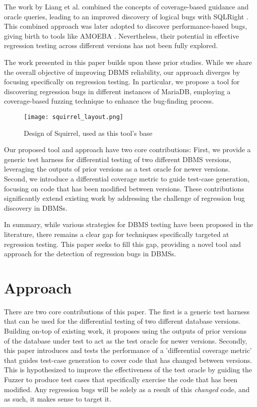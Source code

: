 \documentclass[sigconf]{acmart}
\begin{document}
The work by Liang et al. combined the concepts of coverage-based guidance and oracle queries, leading to an improved discovery of logical bugs with SQLRight \cite{liang2022detecting}. This combined approach was later adopted to discover performance-based bugs, giving birth to tools like AMOEBA \cite{9793961}. Nevertheless, their potential in effective regression testing across different versions has not been fully explored.

The work presented in this paper builds upon these prior studies. While we share the overall objective of improving DBMS reliability, our approach diverges by focusing specifically on regression testing. In particular, we propose a tool for discovering regression bugs in different instances of MariaDB, employing a coverage-based fuzzing technique to enhance the bug-finding process.

\begin{figure}[H]
\centering
\texttt{[image: squirrel\_layout.png]}
\caption{Design of Squirrel, used as this tool's base \cite{zhong2020squirrel}}
\label{fig:Squirrel_execution_flow}
\end{figure}

Our proposed tool and approach have two core contributions: First, we provide a generic test harness for differential testing of two different DBMS versions, leveraging the outputs of prior versions as a test oracle for newer versions. Second, we introduce a differential coverage metric to guide test-case generation, focusing on code that has been modified between versions. These contributions significantly extend existing work by addressing the challenge of regression bug discovery in DBMSs.

In summary, while various strategies for DBMS testing have been proposed in the literature, there remains a clear gap for techniques specifically targeted at regression testing. This paper seeks to fill this gap, providing a novel tool and approach for the detection of regression bugs in DBMSs.


\section{Approach}

There are two core contributions of this paper. The first is a generic test harness that can be used for the differential testing of two different database versions. Building on-top of existing work, it proposes using the outputs of prior versions of the database under test to act as the test oracle for newer versions. Secondly, this paper introduces and tests the performance of a 'differential coverage metric' that guides test-case generation to cover code that has changed between versions. This is hypothesized to improve the effectiveness of the test oracle by guiding the Fuzzer to produce test cases that specifically exercise the code that has been modified. Any regression bugs will be solely as a result of this \textit{changed} code, and as such, it makes sense to target it.
\end{document}
